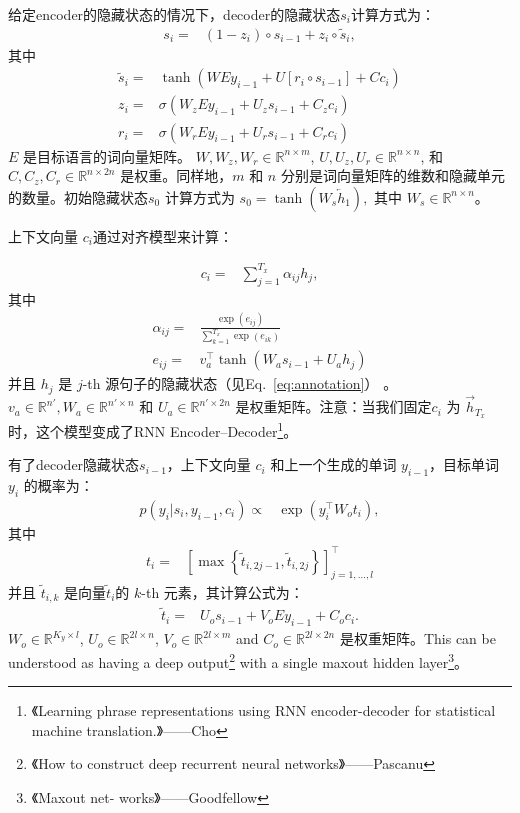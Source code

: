 \documentclass[a4paper,UTF8,no-math]{ctexart}
\newcommand{\RR}[0]{\mathbb{R}}
\newcommand{\ola}{\overleftarrow}
\newcommand{\ora}{\overrightarrow}
\begin{document}
	给定encoder的隐藏状态的情况下，decoder的隐藏状态$s_i$计算方式为：\begin{align*}
	s_i =& (1 - z_i) \circ s_{i-1} + z_i \circ \tilde{s}_i,
	\end{align*}
	其中
	\begin{align*}
	\tilde{s}_{i} =& \tanh \left( W E y_{i - 1} + U \left[ r_i \circ s_{i - 1} \right] +
	C c_i \right) \\ 
	z_i =& \sigma\left( W_z E y_{i - 1} + U_z s_{i-1} 
	+ C_z c_i \right)\\
	r_i =& \sigma\left( W_r E y_{i - 1} + U_r s_{i-1}
	+ C_r c_i \right)
	\end{align*}$E$ 是目标语言的词向量矩阵。
	$W, W_z, W_r \in \mathbb{R}^{n\times m}$, 
	$U, U_z, U_r \in \mathbb{R}^{n\times n}$, 和
	$C, C_z, C_r \in \mathbb{R}^{n\times 2n}$ 是权重。同样地，$m$ 和 $n$ 分别是词向量矩阵的维数和隐藏单元的数量。初始隐藏状态$s_0$ 计算方式为
	$
	s_{0} = \tanh\left( W_s \ola{h}_1 \right),
	$
	其中 $W_s \in \RR^{n \times n}$。
	
	上下文向量 $c_i$通过对齐模型来计算：
	
	\begin{align*}
	c_i =& \sum_{j=1}^{T_x} \alpha_{ij} h_j,
	\end{align*}
	其中
	\begin{align*}
	\alpha_{ij} =& \frac{\exp\left(e_{ij}\right)}{\sum_{k=1}^{T_x}
		\exp\left(e_{ik}\right)}  \\
	e_{ij} =& v_a^{\top} \tanh\left( W_a s_{i-1} + U_a h_j \right)
	\end{align*}
	并且 $h_j$ 是 $j$-th 源句子的隐藏状态（见Eq.~\eqref{eq:annotation}） 。$v_a \in \mathbb{R}^{n'}, W_a \in
	\mathbb{R}^{n'\times n}$ 和 $U_a \in \mathbb{R}^{n'\times  2n}$ 是权重矩阵。注意：当我们固定$c_i$ 为 $\ora{h}_{T_x}$时，这个模型变成了RNN Encoder--Decoder\footnote{《Learning phrase representations using RNN encoder-decoder for statistical machine translation.》——Cho}。
	
	有了decoder隐藏状态$s_{i-1}$，上下文向量 $c_{i}$ 和上一个生成的单词
	$y_{i-1}$，目标单词  $y_{i}$ 的概率为：
	\begin{align*}
	p(y_{i}|s_i,y_{i-1},c_{i}) \propto& \exp\left(y_{i}^{\top} W_o t_{i}\right),
	\end{align*}
	其中
	\begin{align*}
	t_i =&  \left[ \max\left\{\tilde{t}_{i, 2j-1}, \tilde{t}_{i,2j}\right\}
	\right]_{j=1,\ldots,l}^{\top}
	\end{align*}
	并且 $\tilde{t}_{i,k}$ 是向量$\tilde{t}_i$的 $k$-th 元素，其计算公式为：
	\begin{align*}
	\tilde{t}_{i} =& U_o s_{i - 1} + V_o E y_{i-1} + C_o c_i.
	\end{align*}
	$W_o \in \mathbb{R}^{K_y\times  l}$, $U_o \in \mathbb{R}^{2l\times n}$, $V_o \in
	\mathbb{R}^{2l\times m}$ and $C_o \in \mathbb{R}^{2l\times 2n}$ 是权重矩阵。This can be understood as having a deep output\footnote{《How to construct deep recurrent neural
		networks》——Pascanu}
	with a single maxout hidden layer\footnote{《Maxout net-
		works》——Goodfellow}。
	
\end{document}
